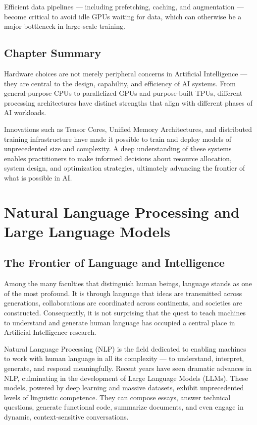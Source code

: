 \documentclass[openany]{book}
\begin{document}
Efficient data pipelines — including prefetching, caching, and augmentation — 
become critical to avoid idle GPUs waiting for data, which can otherwise be a 
major bottleneck in large-scale training.

\section{Chapter Summary}

Hardware choices are not merely peripheral concerns in Artificial Intelligence — 
they are central to the design, capability, and efficiency of AI systems. From 
general-purpose CPUs to parallelized GPUs and purpose-built TPUs, different 
processing architectures have distinct strengths that align with different 
phases of AI workloads.

Innovations such as Tensor Cores, Unified Memory Architectures, and distributed 
training infrastructure have made it possible to train and deploy models of 
unprecedented size and complexity. A deep understanding of these systems enables 
practitioners to make informed decisions about resource allocation, system 
design, and optimization strategies, ultimately advancing the frontier of what 
is possible in AI.

\chapter{Natural Language Processing and Large Language Models}

\section{The Frontier of Language and Intelligence}

Among the many faculties that distinguish human beings, language stands as one 
of the most profound. It is through language that ideas are transmitted across 
generations, collaborations are coordinated across continents, and societies 
are constructed. Consequently, it is not surprising that the quest to teach 
machines to understand and generate human language has occupied a central place 
in Artificial Intelligence research.

Natural Language Processing (NLP) is the field dedicated to enabling machines 
to work with human language in all its complexity — to understand, interpret, 
generate, and respond meaningfully. Recent years have seen dramatic advances in 
NLP, culminating in the development of Large Language Models (LLMs). These 
models, powered by deep learning and massive datasets, exhibit unprecedented 
levels of linguistic competence. They can compose essays, answer technical 
questions, generate functional code, summarize documents, and even engage in 
dynamic, context-sensitive conversations.
\end{document}
